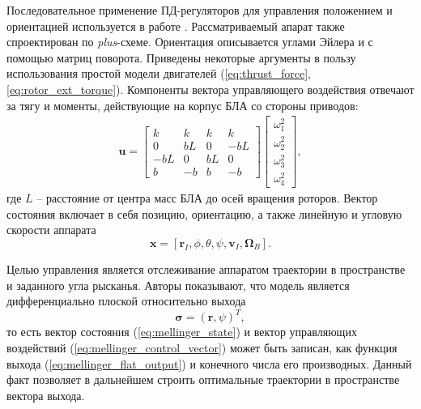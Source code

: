 Последовательное применение ПД-регуляторов для управления положением и ориентацией используется в работе \cite{Mellinger01}. Рассматриваемый апарат также спроектирован по \textit{plus}-схеме.
Ориентация описывается углами Эйлера и с помощью матриц поворота.
Приведены некоторые аргументы в пользу использования простой модели двигателей
(\ref{eq:thrust_force}, \ref{eq:rotor_ext_torque}).
Компоненты вектора управляющего воздействия отвечают за тягу и моменты, действующие на корпус БЛА со стороны приводов:
\begin{equation} \label{eq:mellinger_control_vector}
	\begin{aligned}
	\bm{u} =
	\begin{bmatrix}
	k & k & k & k\\
	0 & bL & 0 & -bL\\
	-bL & 0 & bL & 0\\
	b & -b & b & -b
	\end{bmatrix}
	\begin{bmatrix}
	\omega^{2}_{1}\\
	\omega^{2}_{2}\\
	\omega^{2}_{3}\\
	\omega^{2}_{4}
	\end{bmatrix},
	\end{aligned}
\end{equation}
где $L$ -- расстояние от центра масс БЛА до осей вращения роторов.
Вектор состояния включает в себя позицию, ориентацию, а также линейную и угловую скорости аппарата
\begin{equation} \label{eq:mellinger_state}
\bm{x} = [\bm{r}_I, \phi, \theta, \psi, \bm{v}_I, \bm{\Omega}_B].
\end{equation}

Целью управления является отслеживание аппаратом траектории в пространстве и заданного угла рысканья. Авторы показывают, что модель является дифференциально плоской \cite{Belinskaya01, Nieuwstadt01} относительно выхода
\begin{equation} \label{eq:mellinger_flat_output}
\bm{\sigma} = (\bm{r},\psi)^T,
\end{equation}
то есть вектор состояния (\ref{eq:mellinger_state}) и вектор управляющих воздействий (\ref{eq:mellinger_control_vector}) может быть записан, как функция выхода  (\ref{eq:mellinger_flat_output}) и конечного числа его производных. Данный факт позволяет в дальнейшем строить оптимальные траектории в пространстве вектора выхода.


